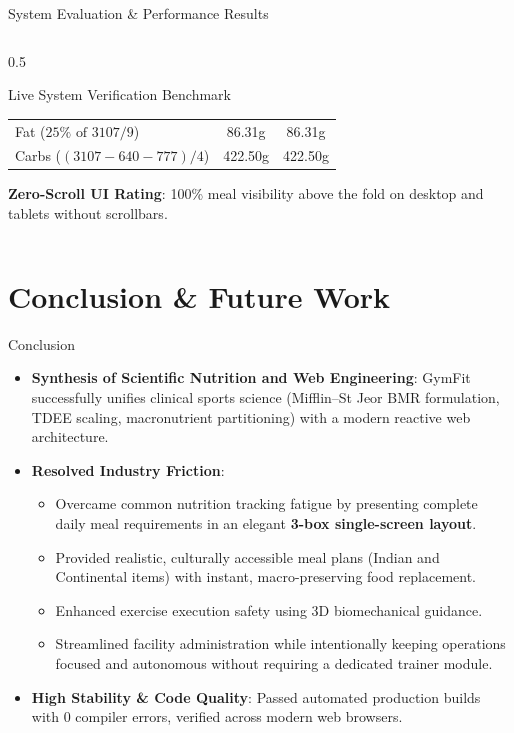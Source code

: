 \documentclass[aspectratio=169,10pt]{beamer}
\begin{document}
\begin{frame}{System Evaluation \& Performance Results}
\begin{columns}[T]
\begin{column}{0.5\textwidth}
\begin{block}{Live System Verification Benchmark}
\begin{table}[h]
\begin{tabular}{lcc}
            Fat ($25\% \text{ of } 3107 / 9$) & 86.31g & 86.31g \\
            Carbs ($(3107 - 640 - 777)/4$) & 422.50g & 422.50g \\
            \bottomrule
          \end{tabular}
        \end{table}
      \end{block}
      \begin{center}
        \textbf{Zero-Scroll UI Rating}: 100\% meal visibility above the fold on desktop and tablets without scrollbars.
      \end{center}
    \end{column}
  \end{columns}
\end{frame}

\section{Conclusion \& Future Work}

\begin{frame}{Conclusion}
  \begin{itemize}
    \item \textbf{Synthesis of Scientific Nutrition and Web Engineering}: GymFit successfully unifies clinical sports science (Mifflin--St Jeor BMR formulation, TDEE scaling, macronutrient partitioning) with a modern reactive web architecture.
    \item \textbf{Resolved Industry Friction}:
    \begin{itemize}
      \item Overcame common nutrition tracking fatigue by presenting complete daily meal requirements in an elegant \textbf{3-box single-screen layout}.
      \item Provided realistic, culturally accessible meal plans (Indian and Continental items) with instant, macro-preserving food replacement.
      \item Enhanced exercise execution safety using 3D biomechanical guidance.
      \item Streamlined facility administration while intentionally keeping operations focused and autonomous without requiring a dedicated trainer module.
    \end{itemize}
    \item \textbf{High Stability \& Code Quality}: Passed automated production builds with 0 compiler errors, verified across modern web browsers.
  \end{itemize}
\end{frame}
\end{document}

